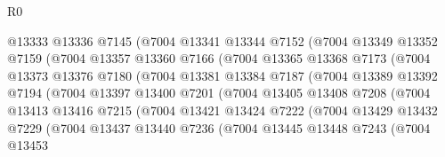\begin{lexlean}{R0}
\begin{coremodule}
                      @13333
                      @13336
                      @7145
                      (@7004
                        @13341
                        @13344
                        @7152
                        (@7004
                          @13349
                          @13352
                          @7159
                          (@7004
                            @13357
                            @13360
                            @7166
                            (@7004
                              @13365
                              @13368
                              @7173
                              (@7004
                                @13373
                                @13376
                                @7180
                                (@7004
                                  @13381
                                  @13384
                                  @7187
                                  (@7004
                                    @13389
                                    @13392
                                    @7194
                                    (@7004
                                      @13397
                                      @13400
                                      @7201
                                      (@7004
                                        @13405
                                        @13408
                                        @7208
                                        (@7004
                                          @13413
                                          @13416
                                          @7215
                                          (@7004
                                            @13421
                                            @13424
                                            @7222
                                            (@7004
                                              @13429
                                              @13432
                                              @7229
                                              (@7004
                                                @13437
                                                @13440
                                                @7236
                                                (@7004
                                                  @13445
                                                  @13448
                                                  @7243
                                                  (@7004
                                                    @13453

\end{coremodule}
\end{lexlean}
